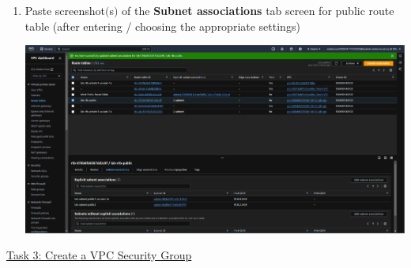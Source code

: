 \documentclass[11pt]{article}
\begin{document}
\begin{enumerate}[resume]
    
    \item Paste screenshot$($s$)$ of the \textbf{Subnet associations} tab screen for public route table (after entering / choosing the appropriate settings) \\
    \vspace{5mm}

    {\centering
    \includegraphics[width=5.8in]{pics/10.png}
    }

\end{enumerate}


\vspace{1cm}

\newpage

\noindent\underline{Task 3: Create a VPC Security Group}
\end{document}
